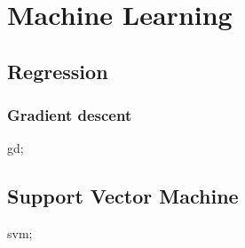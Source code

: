 \chapter{Machine Learning}\label{chp:machine_learning}
\minitoc

\section{Regression}
\subsection{Gradient descent}\label{sec:gradient_descent}
\gls{gd};

\section{Support Vector Machine}
\gls{svm};
